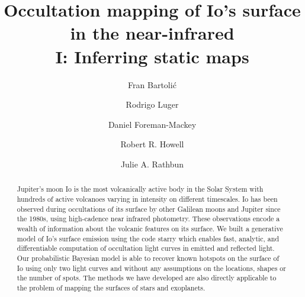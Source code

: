 \documentclass[modern]{aastex62}
\begin{document}
\title{
    \vspace{-3em}
\textbf{Occultation mapping of Io's surface in the near-infrared \\ I: Inferring static maps} 
}
\author[0000-0001-8630-9794]{Fran Bartoli\'c}
\author[0000-0002-0296-3826]{Rodrigo Luger}
\author[0000-0002-9328-5652]{Daniel Foreman-Mackey}
\author[0000-0003-4859-2060]{Robert R. Howell}
\author[0000-0001-7619-652X]{Julie A. Rathbun}
%

\begin{abstract}
Jupiter's moon Io is the most volcanically active body in the Solar System with hundreds of active volcanoes varying in intensity on different timescales.
Io has been observed during occultations of its surface by other Galilean moons and Jupiter since the 1980s, using high-cadence near infrared photometry. 
These observations encode a wealth of information about the volcanic features on its surface.
    We built a generative model of Io's surface emission using the code \textsf{starry} which enables fast, analytic, and differentiable computation of occultation light curves in emitted and reflected light.
    Our probabilistic Bayesian model is able to recover known hotspots on the surface of Io using only two light curves and without any assumptions on the locations, shapes or the number of spots.
    The methods we have developed are also directly applicable to the problem of mapping the surfaces of stars and exoplanets. \href{https://github.com/fbartolic/volcano}{\color{linkcolor}\faGithub}
\end{abstract}

%
\end{document}
